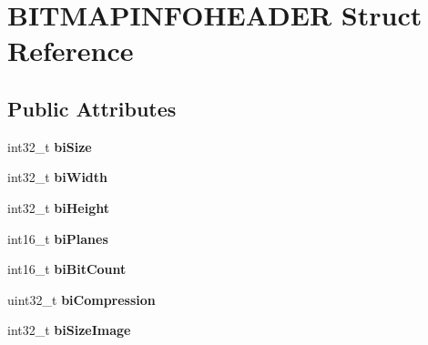 \hypertarget{struct_b_i_t_m_a_p_i_n_f_o_h_e_a_d_e_r}{\section{B\+I\+T\+M\+A\+P\+I\+N\+F\+O\+H\+E\+A\+D\+E\+R Struct Reference}
\label{struct_b_i_t_m_a_p_i_n_f_o_h_e_a_d_e_r}
}
\subsection*{Public Attributes}
\begin{DoxyCompactItemize}
\item 
\hypertarget{struct_b_i_t_m_a_p_i_n_f_o_h_e_a_d_e_r_a15abf0e1e7ceabe24c6957b0c661937e}{int32\+\_\+t {\bfseries bi\+Size}}\label{struct_b_i_t_m_a_p_i_n_f_o_h_e_a_d_e_r_a15abf0e1e7ceabe24c6957b0c661937e}

\item 
\hypertarget{struct_b_i_t_m_a_p_i_n_f_o_h_e_a_d_e_r_ab6b45ba9e693bf65b02ac0f72f257227}{int32\+\_\+t {\bfseries bi\+Width}}\label{struct_b_i_t_m_a_p_i_n_f_o_h_e_a_d_e_r_ab6b45ba9e693bf65b02ac0f72f257227}

\item 
\hypertarget{struct_b_i_t_m_a_p_i_n_f_o_h_e_a_d_e_r_a16bd1d36f8ccb1342f99182fba5f0ebb}{int32\+\_\+t {\bfseries bi\+Height}}\label{struct_b_i_t_m_a_p_i_n_f_o_h_e_a_d_e_r_a16bd1d36f8ccb1342f99182fba5f0ebb}

\item 
\hypertarget{struct_b_i_t_m_a_p_i_n_f_o_h_e_a_d_e_r_a3d7b0d3337eac1a30e883ae5d5924b0e}{int16\+\_\+t {\bfseries bi\+Planes}}\label{struct_b_i_t_m_a_p_i_n_f_o_h_e_a_d_e_r_a3d7b0d3337eac1a30e883ae5d5924b0e}

\item 
\hypertarget{struct_b_i_t_m_a_p_i_n_f_o_h_e_a_d_e_r_a800ac54ea961a62445e611af9fb84623}{int16\+\_\+t {\bfseries bi\+Bit\+Count}}\label{struct_b_i_t_m_a_p_i_n_f_o_h_e_a_d_e_r_a800ac54ea961a62445e611af9fb84623}

\item 
\hypertarget{struct_b_i_t_m_a_p_i_n_f_o_h_e_a_d_e_r_a306b18cffc38667d762180194ad350b1}{uint32\+\_\+t {\bfseries bi\+Compression}}\label{struct_b_i_t_m_a_p_i_n_f_o_h_e_a_d_e_r_a306b18cffc38667d762180194ad350b1}

\item 
\hypertarget{struct_b_i_t_m_a_p_i_n_f_o_h_e_a_d_e_r_aa3d24c269f2bc175f8b5c8ef8a9aa05f}{int32\+\_\+t {\bfseries bi\+Size\+Image}}\label{struct_b_i_t_m_a_p_i_n_f_o_h_e_a_d_e_r_aa3d24c269f2bc175f8b5c8ef8a9aa05f}


\end{DoxyCompactItemize}
